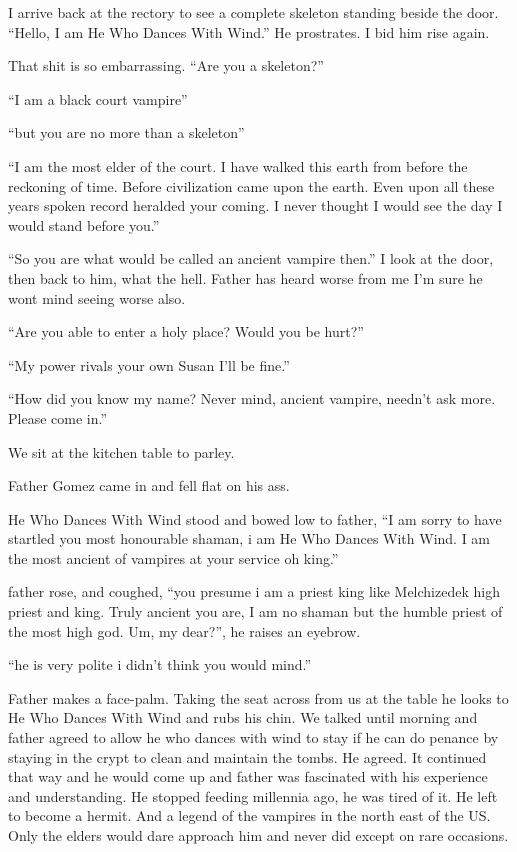 I arrive back at the rectory to see a complete skeleton standing beside the door. ``Hello, I am He Who Dances With Wind.'' He prostrates. I bid him rise again. 

That shit is so embarrassing. ``Are you a skeleton?''

``I am a black court vampire''

``but you are no more than a skeleton''

``I am the most elder of the court. I have walked this earth from before the reckoning of time. Before civilization came upon the earth. Even upon all these years spoken record heralded your coming. I never thought I would see the day I would stand before you.''

``So you are what would be called an ancient vampire then.''
I look at the door, then back to him, what the hell. Father has heard worse from me I'm sure he wont mind seeing worse also.

``Are you able to enter a holy place? Would you be hurt?''

``My power rivals your own Susan I'll be fine.''

``How did you know my name? Never mind, ancient vampire, needn't ask more. Please come in.''

We sit at the kitchen table to parley.

Father Gomez came in and fell flat on his ass.

He Who Dances With Wind stood and bowed low to father, ``I am sorry to have startled you most honourable shaman, i am He Who Dances With Wind. I am the most ancient of vampires at your service oh king.''

father rose, and coughed, ``you presume i am a priest king like Melchizedek high priest and king. Truly ancient you are, I am no shaman but the humble priest of the most high god. Um, my dear?'', he raises an eyebrow.

``he is very polite i didn't think you would mind.''

Father makes a face-palm. Taking the seat across from us at the table he looks to He Who Dances With Wind and rubs his chin.
We talked until morning and father agreed to allow he who dances with wind to stay if he can do penance by staying in the crypt to clean and maintain the tombs. He agreed.
It continued that way and he would come up and father was fascinated with his experience and understanding. He stopped feeding millennia ago, he was tired of it. He left to become a hermit. And a legend of the vampires in the north east of the US. Only the elders would dare approach him and never did except on rare occasions.

